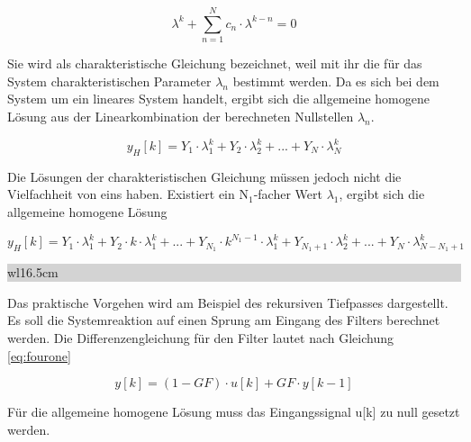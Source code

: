 \begin{equation}\label{eq:fourfifty}
\lambda ^{k} +\sum _{n=1}^{N}c_{n} \cdot \lambda ^{k-n}  =0
\end{equation}

\noindent Sie wird als charakteristische Gleichung bezeichnet, weil mit ihr die f\"{u}r das System charakteristischen Parameter $\lambda_{n}$ bestimmt werden. Da es sich bei dem System um ein lineares System handelt, ergibt sich die allgemeine homogene L\"{o}sung aus der Linearkombination der berechneten Nullstellen $\lambda_{n}$.

\begin{equation}\label{eq:fourfiftyone}
y_{H} \left[k\right]=Y_{1} \cdot \lambda _{1}^{k} +Y_{2} \cdot \lambda _{2}^{k} +...+Y_{N} \cdot \lambda _{N}^{k}
\end{equation}

\noindent Die L\"{o}sungen der charakteristischen Gleichung m\"{u}ssen jedoch nicht die Vielfachheit von eins haben. Existiert ein N${}_{1}$-facher Wert $\lambda_{1}$, ergibt sich die allgemeine homogene L\"{o}sung

\begin{equation}\label{eq:fourfiftytwo}
y_{H} \left[k\right]=Y_{1} \cdot \lambda _{1}^{k} +Y_{2} \cdot k\cdot \lambda _{1}^{k} +...+Y_{N_{1} } \cdot k^{N_{1} -1} \cdot \lambda _{1}^{k} +Y_{N_{1} +1} \cdot \lambda _{2}^{k} +...+Y_{N} \cdot \lambda _{N-N_{1} +1}^{k}
\end{equation}

\noindent
\colorbox{lightgray}{%
%
\renewcommand\arraystretch{0.6}%
\begin{tabular}{ wl{16.5cm} }
{}
\end{tabular}%
}\medskip

\noindent Das praktische Vorgehen wird am Beispiel des rekursiven Tiefpasses dargestellt. Es soll die Systemreaktion auf einen Sprung am Eingang des Filters berechnet werden. Die Differenzengleichung f\"{u}r den Filter lautet nach Gleichung \eqref{eq:fourone}

\begin{equation}\label{eq:fourfiftythree}
y\left[k\right]=\left(1-GF\right)\cdot u\left[k\right]+GF\cdot y\left[k-1\right]
\end{equation}

\noindent F\"{u}r die allgemeine homogene L\"{o}sung muss das Eingangssignal u[k] zu null gesetzt werden.

